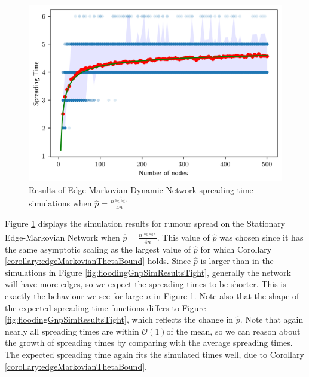 \begin{figure}[h]
	\centering
	\includegraphics[width=1\textwidth]{./figures/flooding_simulation_first_term_max_p_over_4_with_errors.png}
	\caption{Results of Edge-Markovian Dynamic Network spreading time simulations when $\hat{p} = \frac{n^\frac{1}{\log \log n}}{4n}$}
	\label{fig:floodingSimFirstTermMaxPOver4}
\end{figure}

Figure \ref{fig:floodingSimFirstTermMaxPOver4} displays the simulation results for rumour spread on the Stationary Edge-Markovian Network when $\hat{p} = \frac{n^\frac{1}{\log \log n}}{4n}$. This value of $\hat{p}$ was chosen since it has the same asymptotic scaling as the largest value of $\hat{p}$ for which Corollary \ref{corollary:edgeMarkovianThetaBound} holds. Since $\hat{p}$ is larger than in the simulations in Figure \ref{fig:floodingGnpSimResultsTight}, generally the network will have more edges, so we expect the spreading times to be shorter. This is exactly the behaviour we see for large $n$ in Figure \ref{fig:floodingSimFirstTermMaxPOver4}. Note also that the shape of the expected spreading time functions differs to Figure \ref{fig:floodingGnpSimResultsTight}, which reflects the change in $\hat{p}$. Note that again nearly all spreading times are within $\mathcal{O}(1)$of the mean, so we can reason about the growth of spreading times by comparing with the average spreading times. The expected spreading time again fits the simulated times well, due to Corollary \ref{corollary:edgeMarkovianThetaBound}.

